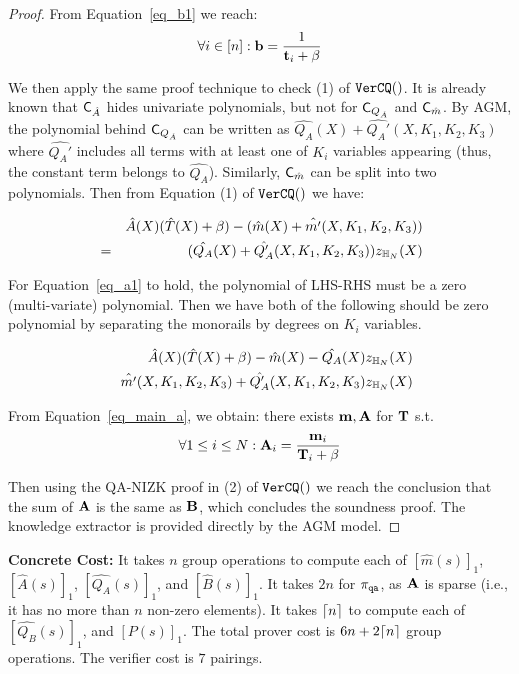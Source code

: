 \begin{proof}
From Equation\ \ref{eq_b1} we reach:
\begin{equation}
\label{eq_bmain}
\forall i\in [n]: {{\mathbf {b}}} = \frac{1}{{{\mathbf {t}}}_i + \beta} 
\end{equation}


We then apply the same proof technique to check (1) of ${\texttt{VerCQ}}()$.
It is already known that ${{\mathsf{C}}_{\hat{A}}}$ hides univariate polynomials,
but not for ${\mathsf{C}}_{{Q_{\hat{A}}}}$ and ${{\mathsf{C}}_{\hat{m}}}$. By AGM, 
the polynomial behind
${\mathsf{C}}_{{Q_{\hat{A}}}}$ can be written as $\hat{Q_A}(X) + \hat{Q_A'}(X, K_1, K_2, K_3)$
where $\hat{Q_A'}$ includes all terms with at least one of 
$K_i$ variables appearing (thus, the constant term belongs to $\hat{Q_A}$).
Similarly, ${{\mathsf{C}}_{\hat{m}}}$ can be split into two polynomials. Then from
Equation (1) of ${\texttt{VerCQ}}()$ we have:

\begin{eqnarray} \label{eq_a1}
& &\hat{A}(X)(\hat{T}(X) + \beta) - (\hat{m}(X) + \hat{m'}(X,K_1,K_2,K_3)) 
\nonumber \\
&=& (\hat{Q_A}(X) + \hat{Q_A'}(X,K_1,K_2,K_3))z_{\mathbb{H}_{N}}(X)
\end{eqnarray}

For Equation\ \ref{eq_a1} to hold, the polynomial of LHS-RHS must be
a zero (multi-variate) polynomial. Then we have both of the following
should be zero polynomial by separating the monorails by degrees
on $K_i$ variables.

\begin{small}
\begin{eqnarray}
& &\hat{A}(X)(\hat{T}(X) + \beta) - \hat{m}(X) 
- \hat{Q_A}(X)z_{\mathbb{H}_{N}}(X) \label{eq_main_a} \\
& & \hat{m'}(X,K_1,K_2,K_3)  + \hat{Q_A'}(X,K_1,K_2,K_3)z_{\mathbb{H}_{N}}(X)
\end{eqnarray}
\end{small}

From Equation\ \ref{eq_main_a}, we obtain: there exists
${{\mathbf {m}}},{{\mathbf {A}}}$ for ${{\mathbf {T}}}$ s.t.
\begin{equation} 
 \forall 1\leq i\leq N: 
	{{\mathbf {A}}}_i = \frac{{{\mathbf {m}}}_i}{{{\mathbf {T}}}_i + \beta} 
\label{eq_a}
\end{equation}

Then using the QA-NIZK proof in (2) of ${\texttt{VerCQ}}()$
we reach the conclusion that the sum of ${{\mathbf {A}}}$ is the same
as ${{\mathbf {B}}}$, which concludes the soundness proof.
The knowledge extractor is provided directly by
the AGM model.
\end{proof}

{\bf Concrete Cost:} It takes $n$ group operations
to compute each of 
$[\hat{m}(s)]_1$,
$[\hat{A}(s)]_1$,
$[\hat{Q_A}(s)]_1$, and
$[\hat{B}(s)]_1$.
It takes $2n$ for $\pi_{\texttt{qa}}$, as ${{\mathbf {A}}}$ is sparse (i.e.,
it has no more than $n$ non-zero elements).
It takes ${\lceil{n}\rceil}$ to compute each of
$[\hat{Q_B}(s)]_1$, and
$[P(s)]_1$.
The total prover cost is $6n + 2{\lceil{n}\rceil}$ group operations.
The verifier cost is $7$ pairings.


